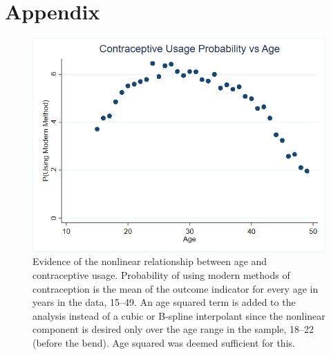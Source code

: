 \documentclass[12pt]{article}
\begin{document}
\section{Appendix}
\begin{figure}[ht]
    \centering
    \includegraphics[width=\textwidth]{figures/fig1.png}
    \caption{
        \label{fig:1}
        Evidence of the nonlinear relationship between age and contraceptive usage.
        Probability of using modern methods of contraception is the mean of the outcome indicator for every age in years in the data, 15--49.
        An age squared term is added to the analysis instead of a cubic or B-spline interpolant since the nonlinear component is desired only over the age range in the sample, 18--22 (before the bend).
        Age squared was deemed sufficient for this.
    }
\end{figure}
\end{document}
